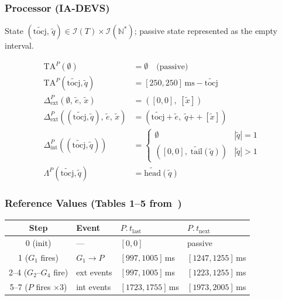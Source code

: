 \subsubsection*{Processor (IA-DEVS)}

State $(\widetilde{\text{tocj}},\, \tilde{q}) \in \mathcal{I}(T) \times \mathcal{I}(\mathbb{N}^*)$;
passive state represented as the empty interval.

\begin{align*}
  \mathrm{TA}^P(\emptyset) &= \emptyset \quad\text{(passive)} \\
  \mathrm{TA}^P(\widetilde{\text{tocj}}, \tilde{q})
    &= [250,250]\,\text{ms} - \widetilde{\text{tocj}} \\
  \Delta^P_{\text{ext}}\!\left(\emptyset,\, \tilde{e},\, \tilde{x}\right)
    &= ([0,0],\; [\tilde{x}]) \\
  \Delta^P_{\text{ext}}\!\left((\widetilde{\text{tocj}}, \tilde{q}),\,
      \tilde{e},\, \tilde{x}\right)
    &= (\widetilde{\text{tocj}} + \tilde{e},\;
       \tilde{q} \mathbin{+\!\!+} [\tilde{x}]) \\
  \Delta^P_{\text{int}}\!\left((\widetilde{\text{tocj}}, \tilde{q})\right)
    &= \begin{cases}
         \emptyset & |\tilde{q}| = 1 \\
         ([0,0],\; \widetilde{\text{tail}}(\tilde{q})) & |\tilde{q}| > 1
       \end{cases} \\
  \Lambda^P(\widetilde{\text{tocj}}, \tilde{q})
    &= \widetilde{\text{head}}(\tilde{q})
\end{align*}

\subsubsection*{Reference Values (Tables 1--5 from~\cite{VDW21})}

\begin{center}
\begin{tabular}{@{}clll@{}}
  \toprule
  Step & Event & $P.\,t_{\text{last}}$ & $P.\,t_{\text{next}}$ \\
  \midrule
  0 (init) & --- & $[0,0]$ & passive \\
  1 ($G_1$ fires) & $G_1 \to P$ & $[997,1005]$\,ms & $[1247,1255]$\,ms \\
  2--4 ($G_2$--$G_4$ fire) & ext events & $[997,1005]$\,ms & $[1223,1255]$\,ms \\
  5--7 ($P$ fires $\times 3$) & int events & $[1723,1755]$\,ms & $[1973,2005]$\,ms \\
  \bottomrule
\end{tabular}
\end{center}

